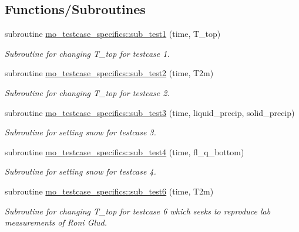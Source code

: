 \subsection*{Functions/Subroutines}
\begin{DoxyCompactItemize}
\item 
subroutine \hyperlink{namespacemo__testcase__specifics_a86b57477e64f1d4072cbf54a96a4af59}{mo\_\-testcase\_\-specifics::sub\_\-test1} (time, T\_\-top)
\begin{DoxyCompactList}\small\item\em Subroutine for changing T\_\-top for testcase 1. \item\end{DoxyCompactList}\item 
subroutine \hyperlink{namespacemo__testcase__specifics_a304d7bfb9ab386dafb7499298d987ab4}{mo\_\-testcase\_\-specifics::sub\_\-test2} (time, T2m)
\begin{DoxyCompactList}\small\item\em Subroutine for changing T\_\-top for testcase 2. \item\end{DoxyCompactList}\item 
subroutine \hyperlink{namespacemo__testcase__specifics_aac3a50dbd4296f51264034abca3890ef}{mo\_\-testcase\_\-specifics::sub\_\-test3} (time, liquid\_\-precip, solid\_\-precip)
\begin{DoxyCompactList}\small\item\em Subroutine for setting snow for testcase 3. \item\end{DoxyCompactList}\item 
subroutine \hyperlink{namespacemo__testcase__specifics_aed1ec369607b5f1bc51a1d93f8106e29}{mo\_\-testcase\_\-specifics::sub\_\-test4} (time, fl\_\-q\_\-bottom)
\begin{DoxyCompactList}\small\item\em Subroutine for setting snow for testcase 4. \item\end{DoxyCompactList}\item 
subroutine \hyperlink{namespacemo__testcase__specifics_a935370b45b47663d79fa1621dbec15b9}{mo\_\-testcase\_\-specifics::sub\_\-test6} (time, T2m)
\begin{DoxyCompactList}\small\item\em Subroutine for changing T\_\-top for testcase 6 which seeks to reproduce lab measurements of Roni Glud. \item\end{DoxyCompactList}\end{DoxyCompactItemize}
